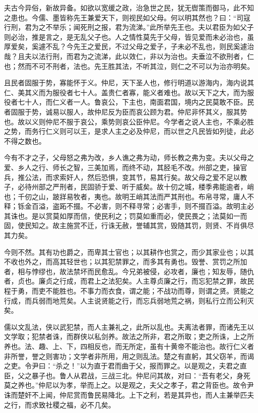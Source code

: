 \documentclass[]{article}
\begin{document}
夫古今异俗，新故异备。如欲以宽缓之政，治急世之民，犹无辔策而御马，此不知之患也。今儒、墨皆称先王兼爱天下，则视民如父母。何以明其然也？曰：``司寇行刑，君为之不举乐；闻死刑之报，君为流涕。''此所举先王也。夫以君臣为如父子则必治，推是言之，是无乱父子也。人之情性莫先于父母，皆见爱而未必治也，虽厚爱矣，奚遽不乱？今先王之爱民，不过父母之爱子，子未必不乱也，则民奚遽治哉？且夫以法行刑，而君为之流涕，此以效仁，非以为治也。夫垂泣不欲刑者，仁也；然而不可不刑者，法也。先王胜其法，不听其泣，则仁之不可以为治亦明矣。

且民者固服于势，寡能怀于义。仲尼，天下圣人也，修行明道以游海内，海内说其仁、美其义而为服役者七十人。盖贵仁者寡，能义者难也。故以天下之大，而为服役者七十人，而仁义者一人。鲁哀公，下主也，南面君国，境内之民莫敢不臣。民者固服于势，诚易以服人，故仲尼反为臣而哀公顾为君。仲尼非怀其义，服其势也。故以义则仲尼不服于哀公，乘势则哀公臣仲尼。今学者之说人主也，不乘必胜之势，而务行仁义则可以王，是求人主之必及仲尼，而以世之凡民皆如列徒，此必不得之数也。

今有不才之子，父母怒之弗为改，乡人谯之弗为动，师长教之弗为变。夫以父母之爱、乡人之行、师长之智，三美加焉，而终不动，其胫毛不改。州部之吏，操官兵，推公法，而求索奸人，然后恐惧，变其节，易其行矣。故父母之爱不足以教子，必待州部之严刑者，民固骄于爱、听于威矣。故十仞之城，楼季弗能逾者，峭也；千仞之山，跛牂易牧者，夷也。故明王峭其法而严其刑也。布帛寻常，庸人不释；铄金百溢，盗跖不掇。不必害，则不释寻常；必害手，则不掇百溢。故明主必其诛也。是以赏莫如厚而信，使民利之；罚莫如重而必，使民畏之；法莫如一而固，使民知之。故主施赏不迁，行诛无赦，誉辅其赏，毁随其罚，则贤、不肖俱尽其力矣。

今则不然。其有功也爵之，而卑其士官也；以其耕作也赏之，而少其家业也；以其不收也外之，而高其轻世也；以其犯禁罪之，而多其有勇也。毁誉、赏罚之所加者，相与悖缪也，故法禁坏而民愈乱。今兄弟被侵，必攻者，廉也；知友辱，随仇者，贞也。廉贞之行成，而君上之法犯矣。人主尊贞廉之行，而忘犯禁之罪，故民程于勇，而吏不能胜也。不事力而衣食，谓之能；不战功而尊，则谓之贤。贤能之行成，而兵弱而地荒矣。人主说贤能之行，而忘兵弱地荒之祸，则私行立而公利灭矣。

儒以文乱法，侠以武犯禁，而人主兼礼之，此所以乱也。夫离法者罪，而诸先王以文学取；犯禁者诛，而群侠以私剑养。故法之所非，君之所取；吏之所诛，上之所养也。法、趣、上、下，四相反也，而无所定，虽有十黄帝不能治也。故行仁义者非所誉，誉之则害功；文学者非所用，用之则乱法。楚之有直躬，其父窃羊，而谒之吏。令尹曰：``杀之！''以为直于君而曲于父，报而罪之。以是观之，夫君之直臣，父之暴子也。鲁人从君战，三战三北。仲尼问其故，对曰：``吾有老父，身死莫之养也。''仲尼以为孝，举而上之。以是观之，夫父之孝子，君之背臣也。故令尹诛而楚奸不上闻，仲尼赏而鲁民易降北。上下之利，若是其异也，而人主兼举匹夫之行，而求致社稷之福，必不几矣。
\end{document}
